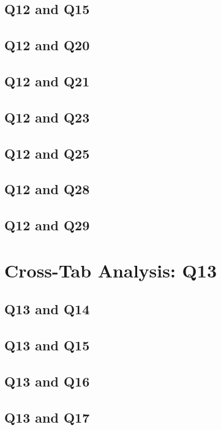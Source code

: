 \documentclass{report}
\begin{document}
\section{Q12 and Q15}\clearpage
\section{Q12 and Q20}\clearpage
\section{Q12 and Q21}\clearpage
\section{Q12 and Q23}\clearpage
\section{Q12 and Q25}\clearpage
\section{Q12 and Q28}\clearpage
\section{Q12 and Q29}\clearpage

\chapter{Cross-Tab Analysis: Q13}

\section{Q13 and Q14}\clearpage
\section{Q13 and Q15}\clearpage
\section{Q13 and Q16}\clearpage
\section{Q13 and Q17}\clearpage
\end{document}
